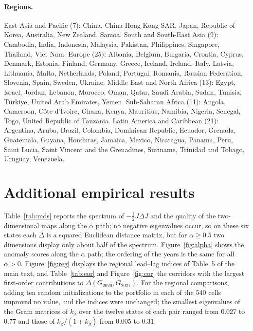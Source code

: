 \documentclass[12pt]{article}
\begin{document}
\paragraph{Regions.} East Asia and Pacific (7): China, China Hong Kong SAR, Japan, Republic of Korea, Australia, New Zealand, Samoa. South and South-East Asia (9): Cambodia, India, Indonesia, Malaysia, Pakistan, Philippines, Singapore, Thailand, Viet Nam. Europe (25): Albania, Belgium, Bulgaria, Croatia, Cyprus, Denmark, Estonia, Finland, Germany, Greece, Iceland, Ireland, Italy, Latvia, Lithuania, Malta, Netherlands, Poland, Portugal, Romania, Russian Federation, Slovenia, Spain, Sweden, Ukraine. Middle East and North Africa (13): Egypt, Israel, Jordan, Lebanon, Morocco, Oman, Qatar, Saudi Arabia, Sudan, Tunisia, T\"urkiye, United Arab Emirates, Yemen. Sub-Saharan Africa (11): Angola, Cameroon, C\^ote d'Ivoire, Ghana, Kenya, Mauritius, Namibia, Nigeria, Senegal, Togo, United Republic of Tanzania. Latin America and Caribbean (21): Argentina, Aruba, Brazil, Colombia, Dominican Republic, Ecuador, Grenada, Guatemala, Guyana, Honduras, Jamaica, Mexico, Nicaragua, Panama, Peru, Saint Lucia, Saint Vincent and the Grenadines, Suriname, Trinidad and Tobago, Uruguay, Venezuela.

\section{Additional empirical results}\label{sec:addemp}

Table~\ref{tab:mds} reports the spectrum of $-\frac12J\Delta J$ and the quality of the two-dimensional maps along the $\alpha$ path; no negative eigenvalues occur, so on these six states each $\Delta$ is a squared Euclidean distance matrix, but for $\alpha\ge0.5$ two dimensions display only about half of the spectrum. Figure~\ref{fig:alpha} shows the anomaly scores along the $\alpha$ path; the ordering of the years is the same for all $\alpha>0$. Figure~\ref{fig:reg} displays the regional lead--lag indices of Table~5 of the main text, and Table~\ref{tab:cor} and Figure~\ref{fig:cor} the corridors with the largest first-order contributions to $\Delta(G_{2020},G_{2021})$. For the regional comparisons, adding ten random initializations to the portfolio in each of the 540 cells improved no value, and the indices were unchanged; the smallest eigenvalues of the Gram matrices of $k_\beta$ over the twelve states of each pair ranged from 0.027 to 0.77 and those of $k_\beta/(1+k_\beta)$ from 0.005 to 0.31.
\end{document}
